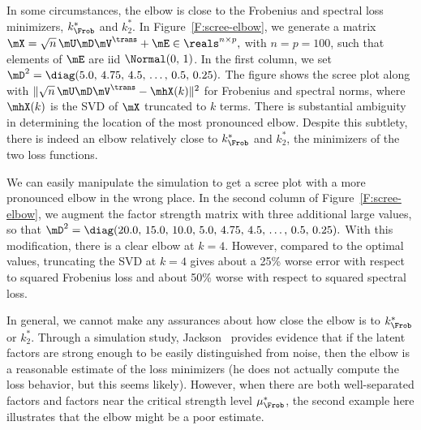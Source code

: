 In some circumstances, the elbow is close to the Frobenius and spectral loss
minimizers, $k_\Frob^\ast$ and $k_2^\ast$. In Figure~\ref{F:scree-elbow}, we
generate a matrix
\(
    \mX = \sqrt{n} \, \mU \mD \mV^\trans + \mE \in \reals^{n \times p},
\)
with $n = p = 100$, such that elements of $\mE$ are iid $\Normal( 0, \, 1)$. 
In the first column, we set
\(
    \mD^2 = \diag( 5.0, \, 4.75, \, 4.5, \, \ldots, \, 0.5, \, 0.25 ).
\)
The figure shows the scree plot along with
\(
    \| \sqrt{n} \, \mU \mD \mV^\trans - \mhX(k) \|^2
\) 
for Frobenius and spectral norms, where $\mhX(k)$ is the SVD of $\mX$
truncated to $k$ terms. There is substantial ambiguity in determining the
location of the most pronounced elbow. Despite this subtlety, there is indeed 
an elbow relatively close to $k_\Frob^\ast$ and $k_2^\ast$, the minimizers of 
the two loss functions.

We can easily manipulate the simulation to get a scree plot with a more 
pronounced elbow in the wrong place.  In the second column of Figure~\ref{F:scree-elbow}, we augment the factor strength matrix with three additional large values, so that
\(
    \mD^2 
    = 
    \diag( 
        20.0, \, 15.0, \, 10.0, \,
        5.0, \, 4.75, \, 4.5, \, \ldots, \, 0.5, \, 0.25 
    ).
\)
With this modification, there is a clear elbow at $k=4$.  However, compared to 
the optimal values, truncating the SVD at $k=4$ gives about a 25\% worse error 
with respect to squared Frobenius loss and about 50\% worse with respect to 
squared spectral loss.

In general, we cannot make any assurances about how close the elbow is to 
$k_\Frob^\ast$ or $k_2^\ast$.  Through a simulation study, 
Jackson~\cite{jackson1993stopping} provides evidence that if the latent 
factors are strong enough to be easily distinguished from noise, then the 
elbow is a reasonable estimate of the loss minimizers (he does not actually compute the loss behavior, but this seems likely).  However, when there 
are both well-separated factors and factors near the critical strength level 
$\mu_\Frob^\ast$, the second example here illustrates that the elbow might be 
a poor estimate.

